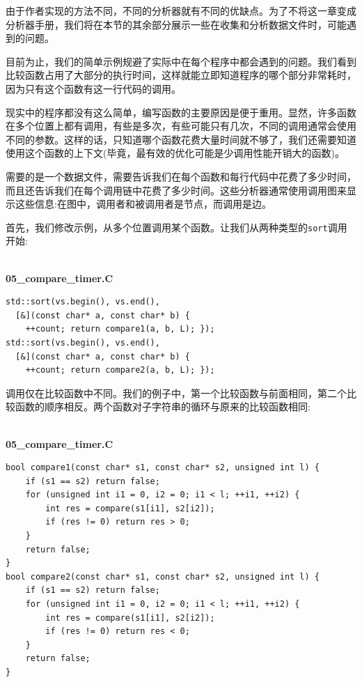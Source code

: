 由于作者实现的方法不同，不同的分析器就有不同的优缺点。为了不将这一章变成分析器手册，我们将在本节的其余部分展示一些在收集和分析数据文件时，可能遇到的问题。


目前为止，我们的简单示例规避了实际中在每个程序中都会遇到的问题。我们看到比较函数占用了大部分的执行时间，这样就能立即知道程序的哪个部分非常耗时，因为只有这个函数有这一行代码的调用。

现实中的程序都没有这么简单，编写函数的主要原因是便于重用。显然，许多函数在多个位置上都有调用，有些是多次，有些可能只有几次，不同的调用通常会使用不同的参数。这样的话，只知道哪个函数花费大量时间就不够了，我们还需要知道使用这个函数的上下文(毕竟，最有效的优化可能是少调用性能开销大的函数)。

需要的是一个数据文件，需要告诉我们在每个函数和每行代码中花费了多少时间，而且还告诉我们在每个调用链中花费了多少时间。这些分析器通常使用调用图来显示这些信息:在图中，调用者和被调用者是节点，而调用是边。

首先，我们修改示例，从多个位置调用某个函数。让我们从两种类型的\texttt{sort}调用开始:

\hspace*{\fill} \\ %
\noindent
\textbf{05\_compare\_timer.C}
\begin{lstlisting}[style=styleCXX]
std::sort(vs.begin(), vs.end(),
  [&](const char* a, const char* b) {
	++count; return compare1(a, b, L); });
std::sort(vs.begin(), vs.end(),
  [&](const char* a, const char* b) {
	++count; return compare2(a, b, L); });
\end{lstlisting}

调用仅在比较函数中不同。我们的例子中，第一个比较函数与前面相同，第二个比较函数的顺序相反。两个函数对子字符串的循环与原来的比较函数相同:

\hspace*{\fill} \\ %
\noindent
\textbf{05\_compare\_timer.C}
\begin{lstlisting}[style=styleCXX]
bool compare1(const char* s1, const char* s2, unsigned int l) {
	if (s1 == s2) return false;
	for (unsigned int i1 = 0, i2 = 0; i1 < l; ++i1, ++i2) {
		int res = compare(s1[i1], s2[i2]);
		if (res != 0) return res > 0;
	}
	return false;
}
bool compare2(const char* s1, const char* s2, unsigned int l) {
	if (s1 == s2) return false;
	for (unsigned int i1 = 0, i2 = 0; i1 < l; ++i1, ++i2) {
		int res = compare(s1[i1], s2[i2]);
		if (res != 0) return res < 0;
	}
	return false;
}
\end{lstlisting}

